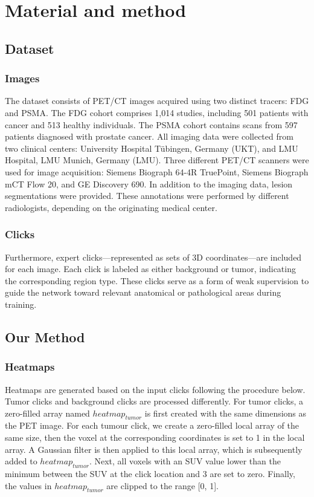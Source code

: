 \documentclass[runningheads]{llncs}
\begin{document}

\section{Material and method}
\subsection{Dataset}
\subsubsection{Images}

The dataset consists of PET/CT images acquired using two distinct tracers: FDG and PSMA.
The FDG cohort comprises 1,014 studies, including 501 patients with cancer and 513 healthy individuals.
The PSMA cohort contains scans from 597 patients diagnosed with prostate cancer.
All imaging data were collected from two clinical centers: University Hospital Tübingen, Germany (UKT), and LMU Hospital, LMU Munich, Germany (LMU).
Three different PET/CT scanners were used for image acquisition: Siemens Biograph 64-4R TruePoint, Siemens Biograph mCT Flow 20, and GE Discovery 690.
In addition to the imaging data, lesion segmentations were provided.
These annotations were performed by different radiologists, depending on the originating medical center.

\subsubsection{Clicks}
Furthermore, expert clicks—represented as sets of 3D coordinates—are included for each image.
Each click is labeled as either background or tumor, indicating the corresponding region type.
These clicks serve as a form of weak supervision to guide the network toward relevant anatomical or pathological areas during training.

\subsection{Our Method}
\subsubsection{Heatmaps}

Heatmaps are generated based on the input clicks following the procedure below.
Tumor clicks and background clicks are processed differently.
For tumor clicks, a zero-filled array named $heatmap_{tumor}$ is first created with the same dimensions as the PET image.
For each tumour click, we create a zero-filled local array of the same size, then the voxel at the corresponding coordinates is set to 1 in the local array.
A Gaussian filter is then applied to this local array, which is subsequently added to $heatmap_{tumor}$.
Next, all voxels with an SUV value lower than the minimum between the SUV at the click location and 3 are set to zero.
Finally, the values in $heatmap_{tumor}$ are clipped to the range [0, 1].
\end{document}
